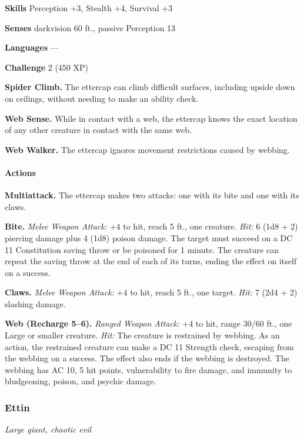 \documentclass[
]{article}
\begin{document}
\textbf{Skills} Perception +3, Stealth +4, Survival +3

\textbf{Senses} darkvision 60 ft., passive Perception 13

\textbf{Languages} ---

\textbf{Challenge} 2 (450 XP)

\textbf{Spider Climb.} The ettercap can climb difficult surfaces,
including upside down on ceilings, without needing to make an ability
check.

\textbf{Web Sense.} While in contact with a web, the ettercap knows the
exact location of any other creature in contact with the same web.

\textbf{Web Walker.} The ettercap ignores movement restrictions caused
by webbing.

\hypertarget{actions-5}{%
\paragraph{Actions}\label{actions-5}}

\textbf{Multiattack.} The ettercap makes two attacks: one with its bite
and one with its claws.

\textbf{Bite.} \emph{Melee Weapon Attack:} +4 to hit, reach 5 ft., one
creature. \emph{Hit:} 6 (1d8 + 2) piercing damage plus 4 (1d8) poison
damage. The target must succeed on a DC 11 Constitution saving throw or
be poisoned for 1 minute. The creature can repeat the saving throw at
the end of each of its turns, ending the effect on itself on a success.

\textbf{Claws.} \emph{Melee Weapon Attack:} +4 to hit, reach 5 ft., one
target. \emph{Hit:} 7 (2d4 + 2) slashing damage.

\textbf{Web (Recharge 5--6).} \emph{Ranged Weapon Attack:} +4 to hit,
range 30/60 ft., one Large or smaller creature. \emph{Hit:} The creature
is restrained by webbing. As an action, the restrained creature can make
a DC 11 Strength check, escaping from the webbing on a success. The
effect also ends if the webbing is destroyed. The webbing has AC 10, 5
hit points, vulnerability to fire damage, and immunity to bludgeoning,
poison, and psychic damage.

\hypertarget{ettin}{%
\subsubsection{Ettin}\label{ettin}}

\emph{Large giant, chaotic evil}
\end{document}
